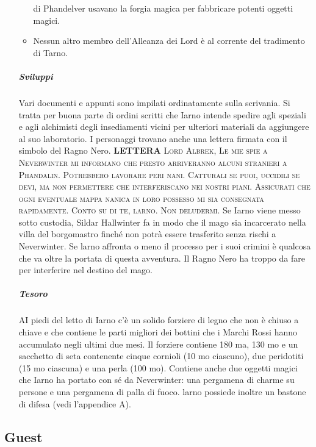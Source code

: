 \documentclass{article}
\begin{document}
\begin{enumerate}
\begin{itemize}
di Phandelver usavano la forgia magica
per fabbricare potenti oggetti magici.
    \item Nessun altro membro dell'Alleanza dei
Lord è al corrente del tradimento di
Tarno.
\end{itemize}
\subparagraph{Sviluppi}
Vari documenti e appunti sono impilati ordinatamente sulla
scrivania. Si tratta per buona parte di ordini scritti che
Iarno intende spedire agli speziali e agli alchimisti degli
insediamenti vicini per ulteriori materiali da aggiungere
al suo laboratorio. I personaggi trovano anche una lettera
firmata con il simbolo del Ragno Nero. \textbf{LETTERA} \textsc{Lord Albrek,
Le mie spie a Neverwinter mi informano che presto
arriveranno alcuni stranieri a Phandalin. Potrebbero lavorare
peri nani. Catturali se puoi, uccidili se devi, ma non
permettere che interferiscano nei nostri piani. Assicurati
che ogni eventuale mappa nanica in loro possesso mi sia
consegnata rapidamente.
Conto su di te, larno. Non deludermi.}
Se Iarno viene messo sotto custodia, Sildar Hallwinter fa in
modo che il mago sia incarcerato nella villa del borgomastro
finché non potrà essere trasferito senza rischi a Neverwinter.
Se larno affronta o meno il processo per i suoi crimini è
qualcosa che va oltre la portata di questa avventura. Il Ragno
Nero ha troppo da fare per interferire nel destino del mago.

\subparagraph{Tesoro}
AI piedi del letto di Iarno c'è un solido forziere di legno che
non è chiuso a chiave e che contiene le parti migliori dei
bottini che i Marchi Rossi hanno accumulato negli ultimi
due mesi. Il forziere contiene 180 ma, 130 mo e un sacchetto
di seta contenente cinque cornioli (10 mo ciascuno), due
peridotiti (15 mo ciascuna) e una perla (100 mo). Contiene
anche due oggetti magici che Iarno ha portato con sé da
Neverwinter: una pergamena di charme su persone e una
pergamena di palla di fuoco.
larno possiede inoltre un bastone di difesa (vedi
l’appendice A).

\end{enumerate}
 

\subsection{Guest}
\end{document}
